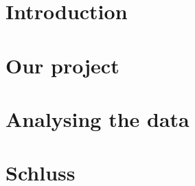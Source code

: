 \chapter{Introduction}
	
	
\chapter{Our project}
	
	
	
		
\chapter{Analysing the data}

	
					
		
\chapter{Schluss}

	
		
		
%	

